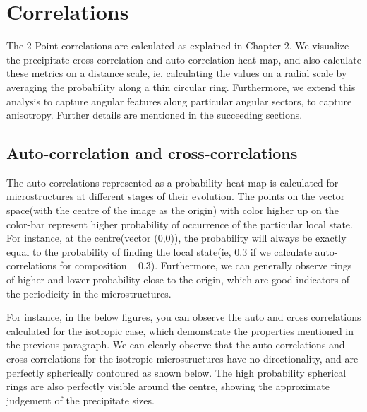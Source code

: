 \documentclass[12pt, a4paper]{report}
\begin{document}
\section{Correlations}
The 2-Point correlations are calculated as explained in Chapter 2. We visualize the precipitate cross-correlation and auto-correlation heat map, and also calculate these metrics on a distance scale, ie. calculating the values on a radial scale by averaging the probability along a thin circular ring. Furthermore, we extend this analysis to capture angular features along particular angular sectors, to capture anisotropy. Further details are mentioned in the succeeding sections.

\subsection{Auto-correlation and cross-correlations}
The auto-correlations represented as a probability heat-map is calculated for microstructures at different stages of their evolution. The points on the vector space(with the centre of the image as the origin) with color higher up on the color-bar represent higher probability of occurrence of the particular local state. For instance, at the centre(vector (0,0)), the probability will always be exactly equal to the probability of finding the local state(ie, 0.3 if we calculate auto-correlations for composition ~ 0.3). Furthermore, we can generally observe rings of higher and lower probability close to the origin, which are good indicators of the periodicity in the microstructures.  

For instance, in the below figures, you can observe the auto and cross correlations calculated for the isotropic case, which demonstrate the properties mentioned in the previous paragraph. We can clearly observe that the auto-correlations and cross-correlations for the isotropic microstructures have no directionality, and are perfectly spherically contoured as shown below. The high probability spherical rings are also perfectly visible around the centre, showing the approximate judgement of the precipitate sizes. 
\end{document}
